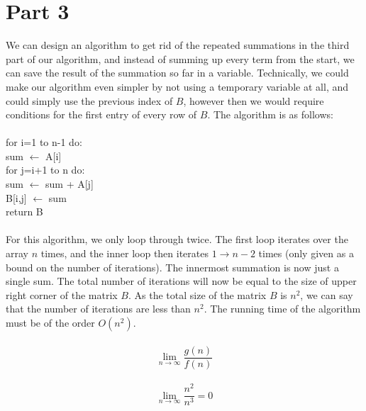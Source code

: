 \documentclass[]{article}
\begin{document}
\section{Part 3}
We can design an algorithm to get rid of the repeated summations in the third part of our algorithm, and instead of summing up every term from the start, we can save the result of the summation so far in a variable. Technically, we could make our algorithm even simpler by not using a temporary variable at all, and could simply use the previous index of $B$, however then we would require conditions for the first entry of every row of $B$. The algorithm is as follows: \\ \\
for i=1 to n-1 do: \\    
\indent sum $\leftarrow$ A[i] \\
\indent for j=i+1 to n do: \\
\indent \indent sum $\leftarrow$ sum + A[j] \\
\indent \indent B[i,j] $\leftarrow$ sum \\
return B \\ \\
For this algorithm, we only loop through twice. The first loop iterates over the array $n$ times, and the inner loop then iterates $1 \rightarrow n-2$ times (only given as a bound on the number of iterations). The innermost summation is now just a single sum. The total number of iterations will now be equal to the size of upper right corner of the matrix $B$. As the total size of the matrix $B$ is $n^2$, we can say that the number of iterations are less than $n^2$. The running time of the algorithm must be of the order $O(n^2)$. \\ \\
\[ \lim_{n\to\infty} \frac{g(n)}{f(n)} \] \\
\[ \lim_{n\to\infty} \frac{n^2}{n^3} = 0 \]  \\
\end{document}
